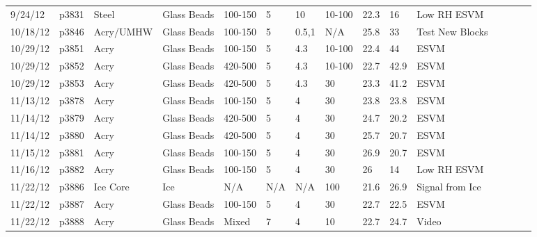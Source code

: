 \begin{landscape}
\begin{longtable} {lllllllllllllll}
9/24/12  & p3831      & Steel            & Glass Beads  & 100-150      & 5         & 10            & 10-100                 & 22.3        & 16       & Low RH ESVM\\
10/18/12 & p3846      & Acry/UMHW        & Glass Beads  & 100-150      & 5         & 0.5,1         & N/A                          & 25.8        & 33       & Test New Blocks\\
10/29/12 & p3851      & Acry          & Glass Beads  & 100-150      & 5         & 4.3           & 10-100                    & 22.4        & 44       & ESVM\\
10/29/12 & p3852      & Acry          & Glass Beads  & 420-500      & 5         & 4.3           & 10-100             & 22.7        & 42.9     & ESVM\\
10/29/12 & p3853      & Acry          & Glass Beads  & 420-500      & 5         & 4.3           & 30                           & 23.3        & 41.2     & ESVM\\
11/13/12 & p3878      & Acry          & Glass Beads  & 100-150      & 5         & 4             & 30                           & 23.8        & 23.8     & ESVM\\
11/14/12 & p3879      & Acry          & Glass Beads  & 420-500      & 5         & 4             & 30                           & 24.7        & 20.2     & ESVM\\
11/14/12 & p3880      & Acry          & Glass Beads  & 420-500      & 5         & 4             & 30                           & 25.7        & 20.7     & ESVM\\
11/15/12 & p3881      & Acry          & Glass Beads  & 100-150      & 5         & 4             & 30                           & 26.9        & 20.7     & ESVM\\
11/16/12 & p3882      & Acry          & Glass Beads  & 100-150      & 5         & 4             & 30                           & 26          & 14       & Low RH ESVM\\
11/22/12 & p3886      & Ice Core         & Ice          & N/A          & N/A       & N/A           & 100                          & 21.6        & 26.9     & Signal from Ice\\
11/22/12 & p3887      & Acry          & Glass Beads  & 100-150      & 5         & 4             & 30                           & 22.7        & 22.5     & ESVM\\
11/22/12 & p3888      & Acry          & Glass Beads  & Mixed        & 7         & 4             & 10                           & 22.7        & 24.7     & Video\\

\end{longtable}
\end{landscape}
